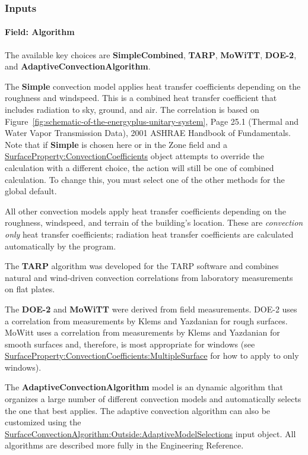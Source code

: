 \subsubsection{Inputs}\label{inputs-5-028}

\paragraph{Field: Algorithm}\label{field-algorithm-1-000}

The available key choices are \textbf{SimpleCombined}, \textbf{TARP}, \textbf{MoWiTT}, \textbf{DOE-2}, and \textbf{AdaptiveConvectionAlgorithm}.

The \textbf{Simple} convection model applies heat transfer coefficients depending on the roughness and windspeed. This is a combined heat transfer coefficient that includes radiation to sky, ground, and air. The correlation is based on Figure~\ref{fig:schematic-of-the-energyplus-unitary-system}, Page 25.1 (Thermal and Water Vapor Transmission Data), 2001 ASHRAE Handbook of Fundamentals. Note that if \textbf{Simple} is chosen here or in the Zone field and a \hyperref[surfacepropertyconvectioncoefficients]{SurfaceProperty:ConvectionCoefficients} object attempts to override the calculation with a different choice, the action will still be one of combined calculation. To change this, you must select one of the other methods for the global default.

All other convection models apply heat transfer coefficients depending on the roughness, windspeed, and terrain of the building's location. These are \emph{convection only} heat transfer coefficients; radiation heat transfer coefficients are calculated automatically by the program.

The \textbf{TARP} algorithm was developed for the TARP software and combines natural and wind-driven convection correlations from laboratory measurements on flat plates.

The \textbf{DOE-2} and \textbf{MoWiTT} were derived from field measurements. DOE-2 uses a correlation from measurements by Klems and Yazdanian for rough surfaces. MoWitt uses a correlation from measurements by Klems and Yazdanian for smooth surfaces and, therefore, is most appropriate for windows (see \hyperref[surfacepropertyconvectioncoefficientsmultiplesurface]{SurfaceProperty:ConvectionCoefficients:MultipleSurface} for how to apply to only windows).

The \textbf{AdaptiveConvectionAlgorithm} model is an dynamic algorithm that organizes a large number of different convection models and automatically selects the one that best applies. The adaptive convection algorithm can also be customized using the \hyperref[surfaceconvectionalgorithmoutsideadaptivemodelselections]{SurfaceConvectionAlgorithm:Outside:AdaptiveModelSelections} input object. All algorithms are described more fully in the Engineering Reference.

